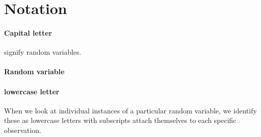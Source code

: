 \section{Notation}
\paragraph{Capital letter} signify random variables.
\paragraph{Random variable}
\paragraph{lowercase letter}When we look at individual instances of a particular random variable, we identify these as lowercase letters with subscripts attach themselves to each specific observation. 